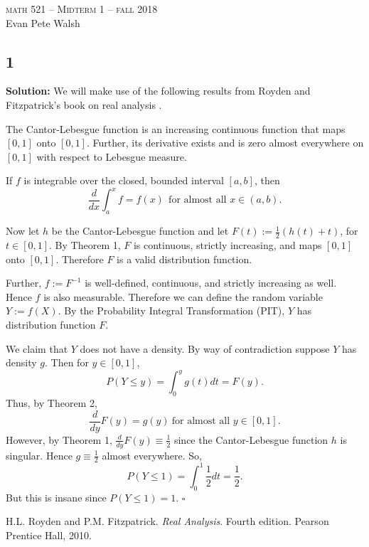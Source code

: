 \documentclass[12pt]{article}
\newcounter{ProofCounter}
\newenvironment{Solution}{\stepcounter{ProofCounter}\textbf{Solution:}}{\hfill$\square$}
\begin{document}
\thispagestyle{empty}
\begin{center}
  \Large \textsc{math 521 -- Midterm 1 -- fall 2018} \\ 
  \vspace{5mm}
  \large Evan Pete Walsh
\end{center}


\subsection*{1}
\begin{Solution}
  We will make use of the following results from Royden and Fitzpatrick's book on real analysis \cite{RF}. \\

  \begin{Theorem}
    The Cantor-Lebesgue function is an increasing continuous function that maps $[0, 1]$ onto $[0, 1]$. Further, its derivative exists and is zero almost everywhere on $[0, 1]$ with respect to Lebesgue measure.
  \end{Theorem}

  \vspace{5mm}

  \begin{Theorem}
    If $f$ is integrable over the closed, bounded interval $[a, b]$, then
    \[
      \frac{d}{dx} \int_{a}^{x} f = f(x) \ \ \text{for almost all $x \in (a, b)$}.
    \]
  \end{Theorem}

  \vspace{5mm}

  Now let $h$ be the Cantor-Lebesgue function and let $F(t) := \frac{1}{2}(h(t) + t)$, for $t \in [0, 1]$. By Theorem 1, $F$ is continuous, strictly increasing, and maps $[0, 1]$ onto $[0, 1]$. Therefore $F$ is a valid distribution function.
  
  Further, $f := F^{-1}$ is well-defined, continuous, and strictly increasing as well. Hence $f$ is also measurable. Therefore we can define the random variable $Y := f(X)$. By the Probability Integral Transformation (PIT), $Y$ has distribution function $F$.

  We claim that $Y$ does not have a density. By way of contradiction suppose $Y$ has density $g$. Then for $y \in [0, 1]$,
  \[
    P(Y \leq y) = \int_{0}^{y} g(t) dt = F(y).
  \]
  Thus, by Theorem 2,
  \[
    \frac{d}{dy} F(y) = g(y) \ \text{for almost all $y \in [0, 1]$}.
  \]
  However, by Theorem 1, $\frac{d}{dy} F(y) \equiv \frac{1}{2}$ since the Cantor-Lebesgue function $h$ is singular. Hence $g \equiv \frac{1}{2}$ almost everywhere.
  So,
  \[
    P(Y \leq 1) = \int_{0}^{1} \frac{1}{2} dt = \frac{1}{2}.
  \]
  But this is insane since $P(Y \leq 1) = 1$.
\end{Solution}


\begin{thebibliography}{9}
    H.L. Royden and P.M. Fitzpatrick.
    \textit{Real Analysis}. Fourth edition.
    Pearson Prentice Hall, 2010.
\end{thebibliography}
\end{document}
